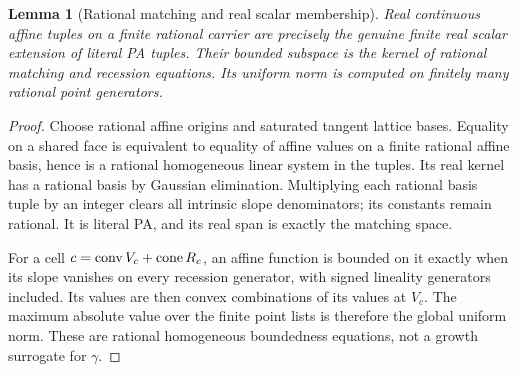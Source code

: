 \documentclass[11pt]{article}
\newtheorem{lemma}[theorem]{Lemma}
\newcommand{\conv}{\operatorname{conv}}\newcommand{\ri}{\operatorname{relint}}
\begin{document}
\begin{lemma}[Rational matching and real scalar membership]\label{l:matching}
Real continuous affine tuples on a finite rational carrier are precisely the genuine finite real scalar extension of literal PA tuples. Their bounded subspace is the kernel of rational matching and recession equations. Its uniform norm is computed on finitely many rational point generators.
\end{lemma}
\begin{proof}
Choose rational affine origins and saturated tangent lattice bases. Equality on a shared face is equivalent to equality of affine values on a finite rational affine basis, hence is a rational homogeneous linear system in the tuples. Its real kernel has a rational basis by Gaussian elimination. Multiplying each rational basis tuple by an integer clears all intrinsic slope denominators; its constants remain rational. It is literal PA, and its real span is exactly the matching space.

For a cell $c=\conv V_c+\cone R_c$, an affine function is bounded on it exactly when its slope vanishes on every recession generator, with signed lineality generators included. Its values are then convex combinations of its values at $V_c$. The maximum absolute value over the finite point lists is therefore the global uniform norm. These are rational homogeneous boundedness equations, not a growth surrogate for $\gamma$.
\end{proof}
\end{document}
